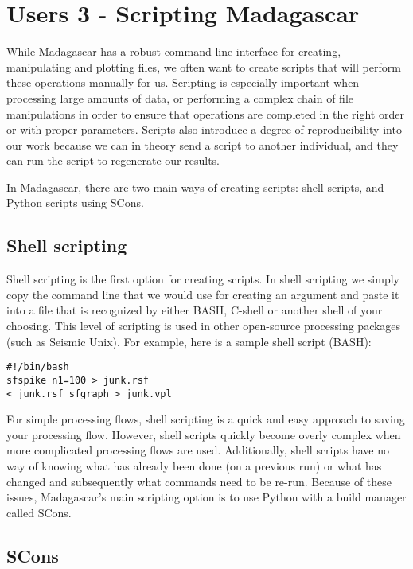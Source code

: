 \section{Users 3 - Scripting Madagascar}

While Madagascar has a robust command line interface for creating, manipulating and plotting files, we often want to create scripts that will perform these operations manually for us.  Scripting is especially important when processing large amounts of data, or performing a complex chain of file manipulations in order to ensure that operations are completed in the right order or with proper parameters.  Scripts also introduce a degree of reproducibility into our work because we can in theory send a script to another individual, and they can run the script to regenerate our results.  

In Madagascar, there are two main ways of creating scripts: shell scripts, and Python scripts using SCons.  

\subsection{Shell scripting}

Shell scripting is the first option for creating scripts.  In shell scripting we simply copy the command line that we would use for creating an argument and paste it into a file that is recognized by either BASH, C-shell or another shell of your choosing.  This level of scripting is used in other open-source processing packages (such as Seismic Unix).  For example, here is a sample shell script (BASH):

\begin{verbatim}
#!/bin/bash
sfspike n1=100 > junk.rsf
< junk.rsf sfgraph > junk.vpl
\end{verbatim}

For simple processing flows, shell scripting is a quick and easy approach to saving your processing flow.  However, shell scripts quickly become overly complex when more complicated processing flows are used.  Additionally, shell scripts have no way of knowing what has already been done (on a previous run) or what has changed and subsequently what commands need to be re-run.  Because of these issues, Madagascar's main scripting option is to use Python with a build manager called SCons.

\subsection{SCons}

